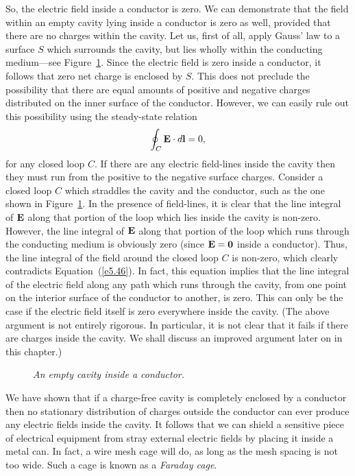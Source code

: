 So, the electric field inside a conductor is zero. We can demonstrate that the field within an empty cavity lying inside a conductor is
 zero as well, provided that there are no charges within the cavity.
Let us, first of all, apply Gauss' law to a surface $S$ which 
surrounds the cavity, but lies
wholly within the conducting medium---see Figure~\ref{f40}. Since the electric field is zero inside a conductor,
it follows that zero net charge is enclosed by $S$. This does not preclude the
possibility that there are equal amounts of positive and negative charges distributed
on the inner surface of the conductor. However, we can easily rule out this
possibility using the steady-state relation
\begin{equation}\label{e5.46}
\oint_C {\bf E} \cdot d{\bf l} = 0,
\end{equation}
for any closed loop $C$. If there are any electric field-lines inside the cavity
then 
they must run from the positive to the negative surface charges. Consider a
closed loop $C$ which straddles the cavity and the conductor, such as the one 
shown  in Figure~\ref{f40}. In the presence of field-lines, it is clear 
that the line integral of ${\bf E}$
along that portion of the loop 
which lies inside the cavity is non-zero. However, the line integral
of ${\bf E}$ 
along that portion of the loop which runs through the conducting medium
 is obviously
zero (since ${\bf E} = {\bf 0}$ inside a conductor).  Thus, the line integral of
the field around the closed loop $C$ is non-zero, which clearly contradicts
Equation~(\ref{e5.46}).
 In fact, this equation implies that the line integral of the electric field
along any path which runs through the cavity, from one point on the interior surface
of the conductor to another, is zero. This can only be the case if the electric
field itself is zero everywhere inside the cavity. (The above argument
is not entirely rigorous. In particular, it is not clear that it fails if there
are charges inside the cavity. We shall discuss an improved argument later on
in this chapter.)
\begin{figure}
\epsfysize=2.5in
\centerline{}
\caption{\em An empty cavity inside a conductor.}\label{f40}
\end{figure}

We have shown that if a charge-free cavity is completely enclosed by a conductor then no
stationary distribution of charges outside the conductor can ever produce any electric fields inside the cavity.
It follows that we can shield a sensitive piece of electrical equipment from stray external electric fields
by placing it inside  a metal can. In fact, a wire mesh cage will do, as long as
the mesh spacing is not too wide. Such a cage is known as a {\em Faraday
cage}.

